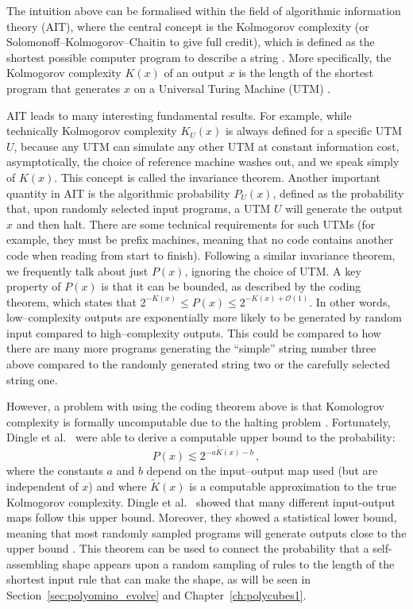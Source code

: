 The intuition above can be formalised within the field of algorithmic information theory (AIT), where the central concept is the Kolmogorov complexity (or Solomonoff–Kolmogorov–Chaitin to give full credit), which is defined as the shortest possible computer program to describe a string \cite{LiMing2019AitK}. More specifically, the Kolmogorov complexity \(K(x)\) of an output \(x\) is the length of the shortest program that generates \(x\) on a Universal Turing Machine (UTM) \cite{LiMing2019AitK}.

AIT leads to many interesting fundamental results. For example, while technically Kolmogorov complexity \(K_U(x)\) is always defined for a specific UTM \(U\), because any UTM can simulate any other UTM at constant information cost, asymptotically, the choice of reference machine washes out, and we speak simply of \(K(x)\). This concept is called the invariance theorem. Another important quantity in AIT is the algorithmic probability \(P_U(x)\), defined as the probability that, upon randomly selected input programs, a UTM \(U\) will generate the output \(x\) and then halt. There are some technical requirements for such UTMs (for example, they must be prefix machines, meaning that no code contains another code when reading from start to finish). Following a similar invariance theorem, we frequently talk about just \(P(x)\), ignoring the choice of UTM. A key property of \(P(x)\) is that it can be bounded, as described by the coding theorem, which states that \(2^{-K(x)} \le P(x) \le 2^{-K(x) + \mathcal{O} (1)}\). In other words, low--complexity outputs are exponentially more likely to be generated by random input compared to high--complexity outputs. This could be compared to how there are many more programs generating the ``simple'' string number three above compared to the randomly generated string two or the carefully selected string one.

However, a problem with using the coding theorem above is that Komologrov complexity is formally uncomputable due to the halting problem \cite{LiMing2019AitK}. Fortunately, Dingle et al.\ \cite{dingle2018input} were able to derive a computable upper bound to the probability:
\begin{equation}\label{eq:altCodingTheorem}
  P(x) \lesssim 2^{-a\widetilde{K}(x) -b}\,,
\end{equation} where the constants \(a\) and \(b\) depend on the input--output map used (but are independent of \(x\)) and where \(\widetilde{K}(x)\) is a computable approximation to the true Kolmogorov complexity.  Dingle et al.\ \cite{dingle2018input} showed that many different input-output maps follow this upper bound. Moreover, they showed a statistical lower bound, meaning that most randomly sampled programs will generate outputs close to the upper bound \cite{dingle2020generic}. This theorem can be used to connect the probability that a self-assembling shape appears upon a random sampling of rules to the length of the shortest input rule that can make the shape, as will be seen in Section~\ref{sec:polyomino_evolve} and Chapter~\ref{ch:polycubes1}.


